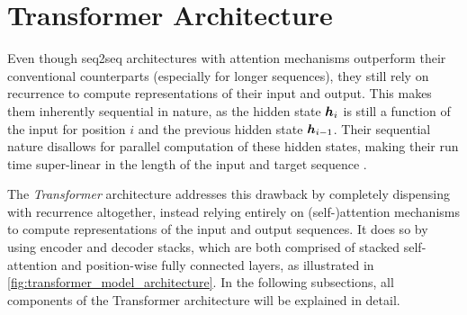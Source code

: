 


\section{Transformer Architecture}
\label{sec:transformer_architecture}

Even though \gls{seq2seq} architectures with attention mechanisms outperform their conventional counterparts (especially for longer sequences), they still rely on recurrence to compute representations of their input and output. This makes them inherently sequential in nature, as the hidden state $\hvect_i$ is still a function of the input for position $i$ and the previous hidden state $\hvect_{i-1}$. Their sequential nature disallows for parallel computation of these hidden states, making their run time super-linear in the length of the input and target sequence \citep{kalchbrenner2016neural,gehring2017convolutional}.

The \emph{Transformer} architecture \citep{vaswani2017attention} addresses this drawback by completely dispensing with recurrence altogether, instead relying entirely on (self-)attention mechanisms to compute representations of the input and output sequences. It does so by using encoder and decoder stacks, which are both comprised of stacked self-attention and position-wise fully connected layers, as illustrated in \cref{fig:transformer_model_architecture}. In the following subsections, all components of the Transformer architecture will be explained in detail.

